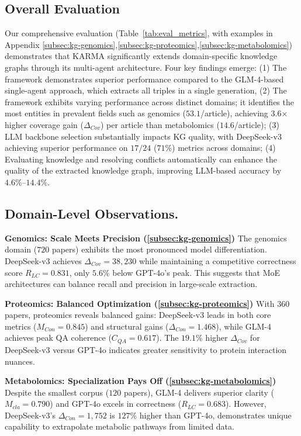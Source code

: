 \documentclass{article}
\begin{document}
\subsection{Overall Evaluation}
Our comprehensive evaluation (Table~\ref{tab:eval_metrics}, with examples in Appendix \ref{subsec:kg-genomics},\ref{subsec:kg-proteomics},\ref{subsec:kg-metabolomics}) demonstrates that KARMA significantly extends domain-specific knowledge graphs through its multi-agent architecture. Four key findings emerge: (1) The framework demonstrates superior performance compared to the GLM-4-based single-agent approach, which extracts all triples in a single generation, (2) The framework exhibits varying performance across distinct domains; it identifies the most entities in prevalent fields such as genomics ($53.1$/article), achieving $3.6$× higher coverage gain ($\Delta_{Cov}$) per article than metabolomics ($14.6$/article); (3) LLM backbone selection substantially impacts KG quality, with DeepSeek-v3 achieving superior performance on $17/24$ ($71\%$) metrics across domains; (4) Evaluating knowledge and resolving conflicts automatically can enhance the quality of the extracted knowledge graph, improving LLM-based accuracy by $4.6\%$–$14.4\%$.

\subsection{Domain-Level Observations.}
\textbf{Genomics: Scale Meets Precision (\ref{subsec:kg-genomics})} 
\noindent The genomics domain ($720$ papers) exhibits the most pronounced model differentiation. DeepSeek-v3 achieves $\Delta_{Cov}=38,230$ while maintaining a competitive correctness score $R_{LC}=0.831$, only $5.6\%$ below GPT-4o's peak. This suggests that MoE architectures can balance recall and precision in large-scale extraction.

\noindent \textbf{Proteomics: Balanced Optimization (\ref{subsec:kg-proteomics})} 
\noindent With $360$ papers, proteomics reveals balanced gains: DeepSeek-v3 leads in both core metrics ($M_{Con}=0.845$) and structural gains ($\Delta_{Con}=1.468$), while GLM-4 achieves peak QA coherence ($C_{QA}=0.617$). The $19.1\%$ higher $\Delta_{Cov}$ for DeepSeek-v3 versus GPT-4o indicates greater sensitivity to protein interaction nuances.

\noindent \textbf{Metabolomics: Specialization Pays Off (\ref{subsec:kg-metabolomics})}
\noindent Despite the smallest corpus ($120$ papers), GLM-4 delivers superior clarity ($M_{cla}=0.790$) and GPT-4o excels in correctness ($R_{LC}=0.683$). However, DeepSeek-v3's $\Delta_{Con}=1,752$ is $127\%$ higher than GPT-4o, demonstrates unique capability to extrapolate metabolic pathways from limited data.
\end{document}
